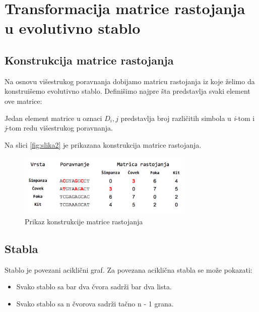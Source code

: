 \section{Transformacija matrice rastojanja u evolutivno stablo}
\label{sec:transformacijamatrice}

\subsection{Konstrukcija matrice rastojanja}
\label{subsec:matricarastojanja}

Na osnovu vi\v{s}estrukog poravnanja dobijamo matricu rastojanja iz koje \v{z}elimo da konstrui\v{s}emo evolutivno stablo.
Defini\v{s}imo najpre \v{s}ta predstavlja svaki element ove matrice:

\begin{definicija}
Jedan element matrice u oznaci $D_i,j$ predstavlja broj razli\v{c}itih simbola u \textit{i}-tom i \textit{j}-tom redu vi\v{s}estrukog poravnanja.
\end{definicija}

Na slici \ref{fig:slika2} je prikazana konstrukcija matrice rastojanja.

\begin{figure}[h]
\centering
\includegraphics[width=0.75\textwidth]{poglavlja/7/slike/slika2.png}
\caption{Prikaz konstrukcije matrice rastojanja}
\end{figure} 

\subsection{Stabla}
\label{subsec:stabla}

Stablo je povezani acikli\v{c}ni graf. Za povezana acikli\v{c}na stabla se mo\v{z}e pokazati:
\begin{itemize}
	\item Svako stablo sa bar dva \v{c}vora sadr\v{z}i bar dva lista.
	\item Svako stablo sa n \v{c}vorova sadr\v{z}i ta\v{c}no n - 1 grana.
\end{itemize}

